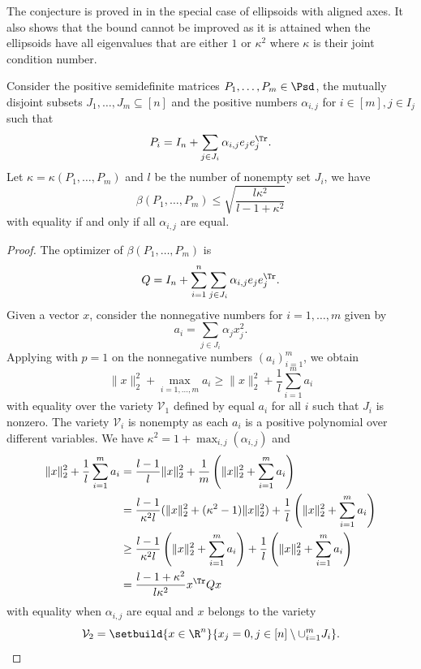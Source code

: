 \documentclass[11pt,twoside,a4paper,openright]{uclouvain-thesis}
\newcommand{\johnintm}{\beta}
\begin{document}
The conjecture is proved in  in the special case of ellipsoids
with aligned axes.
It also shows that the bound cannot be improved as it is attained when the ellipsoids
have all eigenvalues that are either $1$ or $\kappa^2$ where $\kappa$ is their
joint condition number.

\begin{mytheo}
  \label{theo:jcnaligned}
  Consider the positive semidefinite matrices $P_1, \ldots, P_m \in \Psd$,
  the mutually disjoint subsets $J_1, \ldots, J_m \subseteq [n]$
  and the positive numbers $\alpha_{i,j}$ for $i \in [m], j \in I_j$ such that
  \[ P_i = I_n + \sum_{j \in J_i} \alpha_{i,j} e_j e_j^\Tr. \]
  Let $\kappa = \kappa(P_1, \ldots, P_m)$ and $l$ be the number of
  nonempty set $J_i$, we have
  \[ \johnintm(P_1, \ldots, P_m) \le \sqrt{\frac{l\kappa^2}{l-1+\kappa^2}} \]
  with equality if and only if all $\alpha_{i,j}$ are equal.
  \begin{proof}
    The optimizer of $\johnintm(P_1, \ldots, P_m)$ is %
    \[ Q = I_n + \sum_{i = 1}^n \sum_{j \in J_i} \alpha_{i,j} e_je_j^\Tr. \]
    Given a vector $x$, consider the nonnegative numbers for $i = 1, \ldots, m$ given by
    \[ a_i = \sum_{j \in J_i} \alpha_j x_j^2. \]
    Applying  with $p = 1$ on the nonnegative numbers $(a_i)_{i=1}^m$, we obtain
    \[
      \|x\|_2^2 + \max_{i=1, \ldots, m} a_i
      \ge \|x\|_2^2 + \frac{1}{l} \sum_{i=1}^m a_i
    \]
    with equality over the variety $\mathcal{V}_1$ defined by equal $a_i$ for all $i$ such that $J_i$ is nonzero.
    The variety $\mathcal{V}_i$ is nonempty as each $a_i$ is a positive polynomial over different variables.
    We have $\kappa^2 = 1 + \max_{i,j}(\alpha_{i,j})$ and
    \begin{align*}
      \|x\|_2^2 + \frac{1}{l} \sum_{i=1}^m a_i
      & = \frac{l-1}{l} \|x\|_2^2 + \frac{1}{m} \left(\|x\|_2^2 +  \sum_{i=1}^m a_i\right)\\
      & = \frac{l-1}{\kappa^2 l} (\|x\|_2^2 + (\kappa^2 - 1) \|x\|_2^2) + \frac{1}{l} \left(\|x\|_2^2 +  \sum_{i=1}^m a_i\right)\\
      & \ge \frac{l-1}{\kappa^2 l} \left(\|x\|_2^2 + \sum_{i=1}^m a_i \right) + \frac{1}{l} \left(\|x\|_2^2 + \sum_{i=1}^m a_i\right)\\
      & = \frac{l-1+\kappa^2}{l\kappa^2} x^\Tr Q x
    \end{align*}
    with equality when $\alpha_{i,j}$ are equal and $x$ belongs to the variety
    \[ \mathcal{V}_2 = \setbuild{x \in \R^n}{x_j = 0, j \in [n] \setminus \cup_{i=1}^m J_i}. \]

\end{proof}
\end{mytheo}
\end{document}
